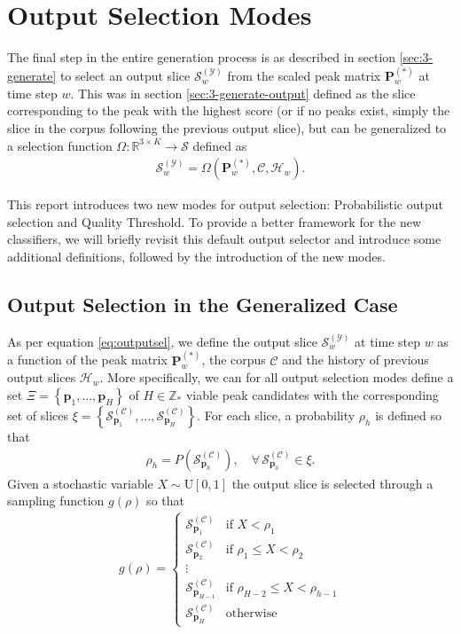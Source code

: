 \section{Output Selection Modes}\label{ssec:output-sel}
The final step in the entire generation process is as described in section \ref{sec:3-generate} to select an output slice $\mathcal S^{(\mathcal Y)}_w$ from the scaled peak matrix $\bm P^{(\ast)}_w$ at time step $w$. This was in section \ref{sec:3-generate-output} defined as the slice corresponding to the peak with the highest score (or if no peaks exist, simply the slice in the corpus following the previous output slice), but can be generalized to a selection function $\Omega \colon \mathbb R^{3\times K} \rightarrow \mathcal S$ defined as
	\begin{align}\label{eq:outputsel}
		\mathcal S^{(\mathcal Y)}_w = \Omega\left(\bm P^{(\ast)}_w, \mathcal C, \mathcal H_w \right).
	\end{align}

This report introduces two new modes for output selection: Probabilistic output selection and Quality Threshold. To provide a better framework for the new classifiers, we will briefly revisit this default output selector and introduce some additional definitions, followed by the introduction of the new modes.

\subsection{Output Selection in the Generalized Case}\label{ssec:default-outputsel}
As per equation \ref{eq:outputsel}, we define the output slice $\mathcal S^{(\mathcal Y)}_w$ at time step $w$ as a function of the peak matrix $\bm P^{(\ast)}_w$, the corpus $\mathcal C$ and the history of previous output slices $\mathcal H_w$. More specifically, we can for all output selection modes define a set $\Xi = \left\lbrace \bm p_1, \dots, \bm p_H\right\rbrace$ of $H \in \mathbb Z_{\ast}$ viable peak candidates with the corresponding set of slices $\xi =\left\lbrace \mathcal S^{(\mathcal C)}_{\bm p_1}, \dots, \mathcal S^{(\mathcal C)}_{\bm p_H}\right\rbrace$. For each slice, a probability $\rho_h$ is defined so that
	\begin{align}
		\rho_h = P\left(\mathcal S^{(\mathcal C)}_{\bm p_h}\right), \quad \forall\, \mathcal S^{(\mathcal C)}_{\bm p_h} \in \xi.
	\end{align}
	Given a stochastic variable $X \sim \text{U}[0,1]$ the output slice is selected through a sampling function $g(\rho)$ so that
	\begin{align}\label{eq:samplingproba}
		g(\rho) = \left\lbrace\begin{array}{cl}
			\mathcal S^{(\mathcal C)}_{\bm p_1} & \text{if } X < \rho_1\\
			\mathcal S^{(\mathcal C)}_{\bm p_2} & \text{if } \rho_1 \le X < \rho_2\\
			\vdots\\
			\mathcal S^{(\mathcal C)}_{\bm p_{H-1}} & \text{if } \rho_{H-2} \le X < \rho_{h-1}\\
			\mathcal S^{(\mathcal C)}_{\bm p_H} & \text{otherwise}
		\end{array}\right.
	\end{align}
	
